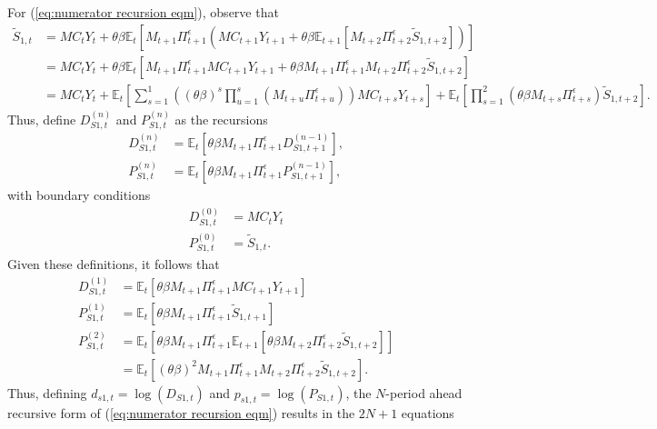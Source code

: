 \documentclass[12 pt, oneside]{article}
\theoremstyle{definition}
\theoremstyle{definition}
\theoremstyle{definition}
\newcommand{\E}{\mathbb{E}}
\begin{document}
For (\ref{eq:numerator recursion eqm}), observe that
\begin{align*}
  \tilde{S}_{1, t} & = MC_t Y_t + \theta\beta\E_t[M_{t + 1}\Pi_{t + 1}^\epsilon (MC_{t + 1}Y_{t + 1} + \theta\beta \E_{t + 1}[M_{ t + 2}\Pi_{t + 2}^\epsilon \tilde{S}_{1, t + 2}])]\\
                   & = MC_t Y_t + \theta\beta\E_t[M_{t + 1}\Pi_{t + 1}^\epsilon MC_{t + 1}Y_{t + 1} + \theta\beta M_{t + 1}\Pi_{t + 1}^\epsilon M_{ t + 2}\Pi_{t + 2}^\epsilon \tilde{S}_{1, t + 2}]\\
                   & =  MC_tY_t+ \E_t\left[\sum_{s = 1}^1 ((\theta\beta)^s \prod_{u = 1}^s (M_{t + u}\Pi_{t + u}^\epsilon)) MC_{t + s}Y_{t + s}\right] + \E_t\left[\prod_{s = 1}^2(\theta\beta M_{t + s} \Pi_{t + s}^\epsilon) \tilde{S}_{1, t + 2}\right].
\end{align*}
Thus, define $D_{S1, t}^{(n)}$ and $P_{S1, t}^{(n)}$ as the recursions
\begin{align*}
  D_{S1, t}^{(n)} & = \E_t[\theta\beta M_{t + 1} \Pi_{t + 1}^\epsilon D_{S1, t + 1}^{(n - 1)}],\\
  P_{S1, t}^{(n)} & = \E_t[\theta\beta M_{t + 1} \Pi_{t + 1}^\epsilon P_{S1, t + 1}^{(n - 1)}],
\end{align*}
with boundary conditions
\begin{align*}
  D_{S1, t}^{(0)} & = MC_t Y_t\\
  P_{S1, t}^{(0)} & = \tilde{S}_{1, t}.
\end{align*}
Given these definitions, it follows that
\begin{align*}
  D_{S1, t}^{(1)} & = \E_t[\theta\beta M_{t + 1} \Pi_{t + 1}^\epsilon MC_{t + 1}Y_{t + 1}]\\
  P_{S1, t}^{(1)} & = \E_t[\theta\beta M_{t + 1}\Pi_{t + 1}^\epsilon \tilde{S}_{1, t + 1}]\\
  P_{S1, t}^{(2)} & = \E_t[\theta\beta M_{t + 1}\Pi_{t + 1}^\epsilon\E_{t + 1}[\theta\beta M_{t + 2}\Pi_{t + 2}^\epsilon \tilde{S}_{1, t + 2}]]\\
                  & = \E_t[(\theta\beta)^2 M_{t + 1}\Pi_{t + 1}^\epsilon M_{t + 2}\Pi_{t + 2}^\epsilon \tilde{S}_{1, t + 2}].
\end{align*}
Thus, defining $d_{s1, t} = \log(D_{S1, t})$ and $p_{s1, t} = \log(P_{S1, t})$,
the $N$-period ahead recursive form of (\ref{eq:numerator recursion eqm}) results in the $2N + 1$ equations
\end{document}

